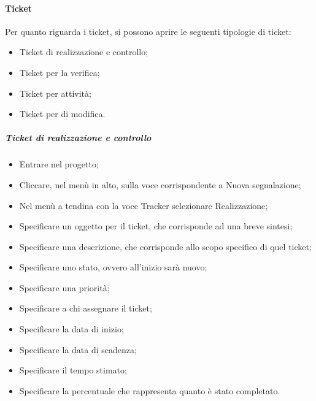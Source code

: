 \paragraph{Ticket}
Per quanto riguarda i ticket, si possono aprire le seguenti tipologie di ticket:
\begin{itemize}
\item Ticket di realizzazione e controllo;
\item Ticket per la verifica;
\item Ticket per  attività;
\item Ticket per di modifica.
\end{itemize}

\subparagraph{Ticket di realizzazione e controllo}
\begin{itemize}
\item Entrare nel progetto;
\item Cliccare, nel menù in alto, sulla voce corrispondente a Nuova segnalazione;
\item Nel menù a tendina con la voce Tracker selezionare Realizzazione;
\item Specificare un oggetto per il ticket, che corrisponde ad una breve sintesi;
\item Specificare una descrizione, che corrisponde allo scopo specifico di quel ticket;
\item Specificare uno stato, ovvero all'inizio sarà nuovo;
\item Specificare una priorità;
\item Specificare a chi assegnare il ticket;
\item Specificare la data di inizio;
\item Specificare la data di scadenza;
\item Specificare il tempo stimato;
\item Specificare la percentuale che rappresenta quanto è stato completato.
\end{itemize}

